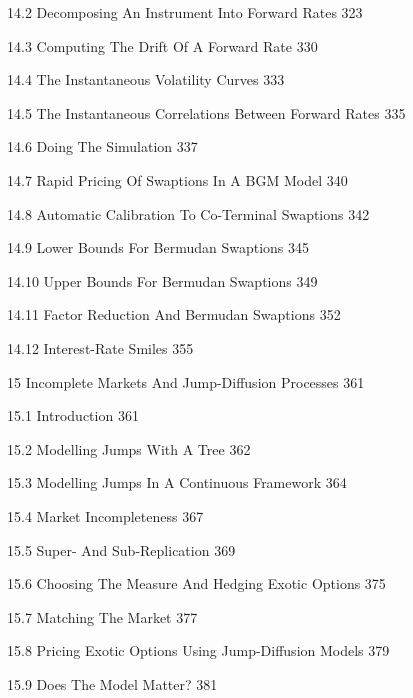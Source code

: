 14.2 Decomposing An Instrument Into Forward Rates 323



14.3 Computing The Drift Of A Forward Rate 330



14.4 The Instantaneous Volatility Curves 333



14.5 The Instantaneous Correlations Between Forward Rates 335



14.6 Doing The Simulation 337



14.7 Rapid Pricing Of Swaptions In A BGM Model 340



14.8 Automatic Calibration To Co-Terminal Swaptions 342



14.9 Lower Bounds For Bermudan Swaptions 345



14.10 Upper Bounds For Bermudan Swaptions 349



14.11 Factor Reduction And Bermudan Swaptions 352



14.12 Interest-Rate Smiles 355



15 Incomplete Markets And Jump-Diffusion Processes 361



15.1 Introduction 361



15.2 Modelling Jumps With A Tree 362



15.3 Modelling Jumps In A Continuous Framework 364



15.4 Market Incompleteness 367



15.5 Super- And Sub-Replication 369



15.6 Choosing The Measure And Hedging Exotic Options 375



15.7 Matching The Market 377



15.8 Pricing Exotic Options Using Jump-Diffusion Models 379



15.9 Does The Model Matter? 381



